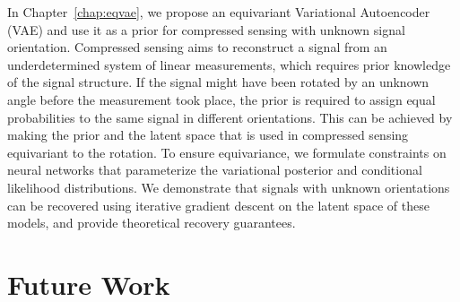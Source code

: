 In Chapter~\ref{chap:eqvae}, we propose an equivariant Variational Autoencoder (VAE) and use it as a prior for compressed sensing with unknown signal orientation. 
Compressed sensing aims to reconstruct a signal from an underdetermined system of linear measurements, which requires prior knowledge of the signal structure. 
If the signal might have been rotated by an unknown angle before the measurement took place, the prior is required to assign equal probabilities to the same signal in different orientations. 
This can be achieved by making the prior and the latent space that is used in compressed sensing equivariant to the rotation. 
To ensure equivariance, we formulate constraints on neural networks that parameterize the variational posterior and conditional likelihood distributions. 
We demonstrate that signals with unknown orientations can be recovered using iterative gradient descent on the latent space of these models, and provide theoretical recovery guarantees.


\section{Future Work}





